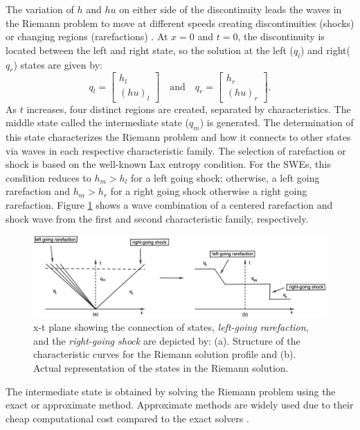 \documentclass[10pt,a4paper]{article}
\begin{document}
	The variation of $h$ and $hu$ on either side of the discontinuity leads the waves in the Riemann problem to move at different speeds creating discontinuities (shocks) or changing regions (rarefactions) \citep{leveque2002finite}.  At $x = 0$ and $t = 0$,   the discontinuity is located between the left and right state, so the solution at the left ($q_{l}$) and right($q_{r}$) states are given by: 
	\begin{equation}
		q_{l} = \begin{bmatrix}
			h_{l} \\( hu)_{l}
		\end{bmatrix}  \quad \text{and} \quad q_{r} = \begin{bmatrix}
			h_{r} \\( hu)_{r}
		\end{bmatrix}.
		\label{ic}
	\end{equation}
	As $t$ increases, four distinct regions are created, separated by characteristics. The middle state called the intermediate state ($q_{m}$) is generated.  The determination of this state characterizes the Riemann problem and how it connects to other states via waves in each respective characteristic family.  The selection of rarefaction or shock is based on the well-known Lax entropy condition.   For the SWEs, this condition reduces to $h_m > h_l$ for a left going shock; otherwise, a left going rarefaction and $h_m>h_r$ for a right going shock otherwise a right going rarefaction.    Figure \ref{fig:x-tplane} shows a wave combination of a centered rarefaction and shock wave from the first and second characteristic family, respectively.
	
	\begin{figure}[H]
		\centering
		\includegraphics[width=.77\linewidth]{images/geo11}
		\caption{ x-t plane showing the connection of states, {\em left-going rarefaction}, and the {\em right-going shock} are depicted by: (a). Structure of the characteristic curves for the  Riemann solution profile and (b). Actual representation of the states in the Riemann solution.}
		\label{fig:x-tplane}
	\end{figure}
	The intermediate state is obtained by solving the Riemann problem using the exact or approximate method. Approximate methods are widely used due to their cheap computational cost compared to the exact solvers \citep{roe1981approximate}.
	
\end{document}
